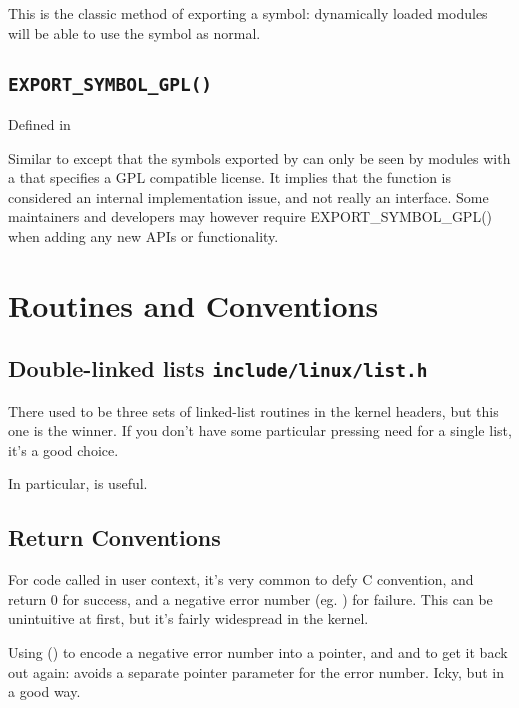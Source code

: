 \documentclass[a4paper,8pt,english]{sphinxmanual}
\begin{document}
This is the classic method of exporting a symbol: dynamically loaded
modules will be able to use the symbol as normal.


\subsection{\texttt{EXPORT\_SYMBOL\_GPL()}}
\label{kernel-hacking/hacking:export-symbol-gpl}
Defined in 

Similar to  except that the symbols
exported by  can only be seen by
modules with a  that specifies a GPL
compatible license. It implies that the function is considered an
internal implementation issue, and not really an interface. Some
maintainers and developers may however require EXPORT\_SYMBOL\_GPL()
when adding any new APIs or functionality.


\section{Routines and Conventions}
\label{kernel-hacking/hacking:routines-and-conventions}

\subsection{Double-linked lists \texttt{include/linux/list.h}}
\label{kernel-hacking/hacking:double-linked-lists-include-linux-list-h}
There used to be three sets of linked-list routines in the kernel
headers, but this one is the winner. If you don't have some particular
pressing need for a single list, it's a good choice.

In particular,  is useful.


\subsection{Return Conventions}
\label{kernel-hacking/hacking:return-conventions}
For code called in user context, it's very common to defy C convention,
and return 0 for success, and a negative error number (eg. ) for
failure. This can be unintuitive at first, but it's fairly widespread in
the kernel.

Using  () to encode a
negative error number into a pointer, and  and
 to get it back out again: avoids a separate
pointer parameter for the error number. Icky, but in a good way.
\end{document}
